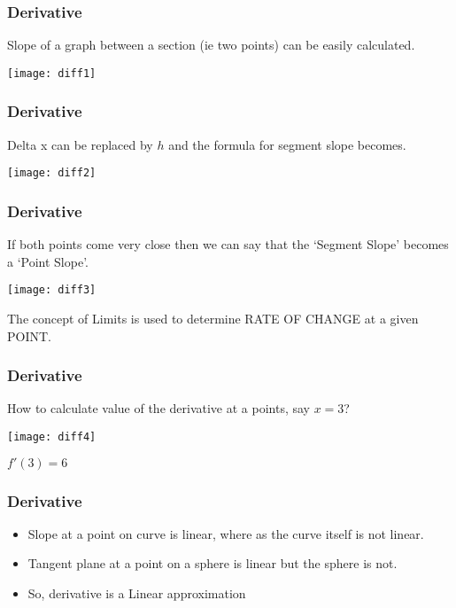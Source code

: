  \begin{frame}[fragile]\frametitle{Derivative}
Slope of a graph between a section (ie two points) can be easily calculated.
\begin{center}
\texttt{[image: diff1]}
\end{center}

\end{frame}


 \begin{frame}[fragile]\frametitle{Derivative}
Delta x can be replaced by $h$ and the formula for segment slope becomes.
\begin{center}
\texttt{[image: diff2]}
\end{center}

\end{frame}

 \begin{frame}[fragile]\frametitle{Derivative}
If both points come very close then we can say that the `Segment Slope' becomes a `Point Slope'.
\begin{center}
\texttt{[image: diff3]}
\end{center}
The concept of Limits is used to determine RATE OF CHANGE at a given POINT.

\end{frame}

 \begin{frame}[fragile]\frametitle{Derivative}
How to calculate value of the derivative at a points, say $x=3$?

\begin{center}
\texttt{[image: diff4]}
\end{center}

$f'(3) = 6$
\end{frame}

 \begin{frame}[fragile]\frametitle{Derivative}
\begin{itemize}
\item Slope at a point on curve is linear, where as the curve itself is not linear.
\item Tangent plane at a point on a sphere is linear but the sphere is not.
\item So, derivative is a Linear approximation
\end{itemize}
\end{frame}


